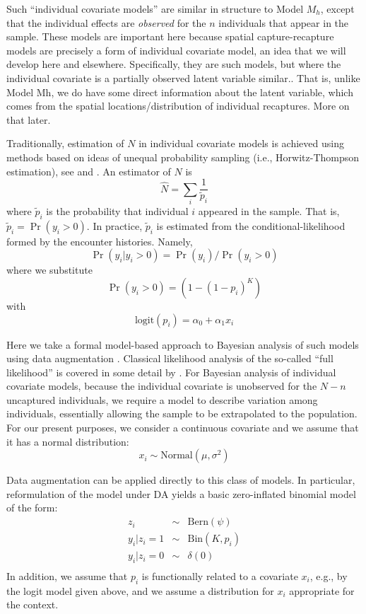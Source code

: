 Such ``individual covariate models'' are similar in structure to Model
$M_{h}$, except that the individual effects are {\it observed} for the
$n$ individuals that appear in the sample. These models are important
here because spatial capture-recapture models are precisely a form of
individual covariate model, an idea that we will develop here and
elsewhere. Specifically, they are such models, but where the
individual covariate is a partially observed latent variable similar..
That is, unlike Model Mh, we do have some direct information about the
latent variable, which comes from the spatial locations/distribution
of individual recaptures. More on that later.

Traditionally, estimation of $N$ in individual covariate models is
achieved using methods based on ideas of unequal probability sampling
(i.e., Horwitz-Thompson estimation), see \citet{huggins:1989} and
\citet{alho:1990}. An estimator of $N$ is
\[
\hat{N} = \sum_{i} \frac{1}{\tilde{p}_{i}}
\]
where $\tilde{p}_{i}$ is the probability that individual $i$ appeared
in the sample.  That is, $\tilde{p}_{i} = \Pr(y_{i}>0)$.  In practice,
$\tilde{p}_{i}$ is estimated from the conditional-likelihood formed by
the encounter histories. Namely,
\[
\Pr(y_{i}|y_{i}>0) = \Pr(y_{i})/\Pr(y_{i}>0)
\]
where we substitute
\[
\Pr(y_{i}>0) = (1- (1-p_{i})^K)
\]
with
\[
\mbox{logit}(p_{i}) = \alpha_{0} + \alpha_{1} x_{i}
\]

Here we take a formal model-based approach to Bayesian analysis of
such models using data augmentation \citep{royle:2009}. Classical
likelihood analysis of the so-called ``full likelihood'' is covered in
some detail by \citet{borchers_etal:2002}.  For Bayesian analysis of
individual covariate models, because the individual covariate is
unobserved for the $N-n$ uncaptured individuals, we require a model to
describe variation among individuals, essentially allowing the sample
to be extrapolated to the population.  For our present purposes, we
consider a continuous covariate and we assume that it has a normal
distribution:
\[
x_{i} \sim \mbox{Normal}(\mu,\sigma^{2})
\]

Data augmentation can be applied directly to this class of models. In
particular, reformulation of the model under DA yields a basic
zero-inflated binomial model of the form:
\begin{eqnarray*}
z_{i} &\sim& \mbox{Bern}(\psi) \\
y_{i}|{z_{i}\! =\! 1} &\sim& \mbox{Bin}(K,p_{i}) \\
y_{i} |{ z_{i}\! =\! 0} &\sim& \delta(0)  \\
\end{eqnarray*}
In addition, we assume that $p_{i}$ is functionally related to a
covariate $x_{i}$, e.g., by the logit model given above, and we assume
a distribution for $x_i$ appropriate for the context.

